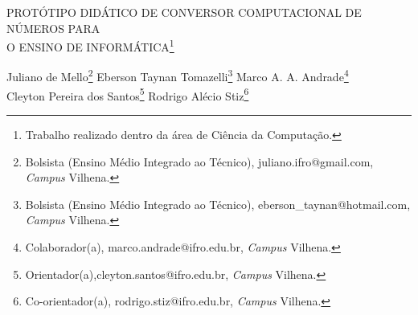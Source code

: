 \documentclass[article,12pt,onesidea,4paper,english,brazil]{abntex2}
\begin{document}
	
	
	\frenchspacing 
	
	\begin{center}
		\LARGE PROTÓTIPO DIDÁTICO DE CONVERSOR COMPUTACIONAL DE NÚMEROS PARA\\ O ENSINO DE INFORMÁTICA\footnote{Trabalho realizado dentro da área de Ciência da Computação.}
		
		\normalsize
		Juliano de Mello\footnote{Bolsista (Ensino Médio Integrado ao Técnico), juliano.ifro@gmail.com, \textit{Campus} Vilhena.} 
		Eberson Taynan Tomazelli\footnote{Bolsista (Ensino Médio Integrado ao Técnico), eberson\_taynan@hotmail.com, \textit{Campus} Vilhena.} 
		Marco A. A. Andrade\footnote{Colaborador(a), marco.andrade@ifro.edu.br, \textit{Campus} Vilhena.} \\
		Cleyton Pereira dos Santos\footnote{Orientador(a),cleyton.santos@ifro.edu.br, \textit{Campus} Vilhena.}
		Rodrigo Alécio Stiz\footnote{Co-orientador(a), rodrigo.stiz@ifro.edu.br, \textit{Campus} Vilhena.} 
	\end{center}
	
\end{document}
